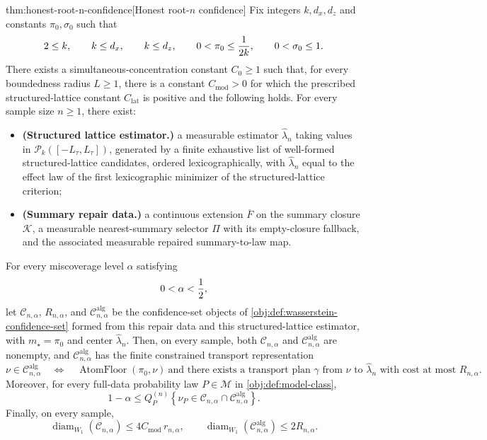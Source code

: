 \documentclass[11pt]{article}
\begin{document}
\begin{theoremv}{thm:honest-root-n-confidence}[Honest root-\(n\) confidence]
Fix integers \(k,d_x,d_z\) and constants \(\pi_0,\sigma_0\) such that
\[
2\le k,\qquad k\le d_x,\qquad k\le d_z,\qquad
0<\pi_0\le {1\over 2k},\qquad 0<\sigma_0\le 1 .
\]
There exists a simultaneous-concentration constant \(C_0\ge 1\) such that, for every boundedness radius \(L\ge 1\), there is a constant \(C_{\mathrm{mod}}>0\) for which the prescribed structured-lattice constant \(C_{\mathrm{lat}}\) is positive and the following holds.  For every sample size \(n\ge 1\), there exist:
\begin{itemize}
\item \textbf{(Structured lattice estimator.)} a measurable estimator \(\widehat\lambda_n\) taking values in \(\mathcal P_k([-L_\tau,L_\tau])\), generated by a finite exhaustive list of well-formed structured-lattice candidates, ordered lexicographically, with \(\widehat\lambda_n\) equal to the effect law of the first lexicographic minimizer of the structured-lattice criterion;
\item \textbf{(Summary repair data.)} a continuous extension \(\overline F\) on the summary closure \(\mathcal K\), a measurable nearest-summary selector \(\Pi\) with its empty-closure fallback, and the associated measurable repaired summary-to-law map.
\end{itemize}
For every miscoverage level \(\alpha\) satisfying
\[
0<\alpha< {1\over 2},
\]
let \(\mathcal C_{n,\alpha}\), \(R_{n,\alpha}\), and \(\mathcal C^{\mathrm{alg}}_{n,\alpha}\) be the confidence-set objects of \cref{obj:def:wasserstein-confidence-set} formed from this repair data and this structured-lattice estimator, with \(m_\star=\pi_0\) and center \(\widehat\lambda_n\).  Then, on every sample, both \(\mathcal C_{n,\alpha}\) and \(\mathcal C^{\mathrm{alg}}_{n,\alpha}\) are nonempty, and \(\mathcal C^{\mathrm{alg}}_{n,\alpha}\) has the finite constrained transport representation
\[
\nu\in\mathcal C^{\mathrm{alg}}_{n,\alpha}
\quad\Longleftrightarrow\quad
\operatorname{AtomFloor}(\pi_0,\nu)\ \text{and there exists a transport plan }\gamma\text{ from }\nu\text{ to }\widehat\lambda_n
\text{ with cost at most }R_{n,\alpha}.
\]
Moreover, for every full-data probability law \(P\in\mathcal M\) in \cref{obj:def:model-class},
\[
1-\alpha
\le
Q_P^{(n)}
\left\{
\nu_P\in\mathcal C_{n,\alpha}\cap\mathcal C^{\mathrm{alg}}_{n,\alpha}
\right\}.
\]
Finally, on every sample,
\[
\operatorname{diam}_{W_1}(\mathcal C_{n,\alpha})
\le
4C_{\mathrm{mod}}\, r_{n,\alpha},
\qquad
\operatorname{diam}_{W_1}(\mathcal C^{\mathrm{alg}}_{n,\alpha})
\le
2R_{n,\alpha}.
\]
\end{theoremv}
\end{document}
